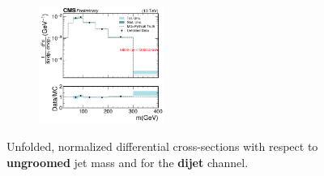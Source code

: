 \begin{figure}[htp!]
\begin{subfigure}
    \end{subfigure}
    \begin{subfigure}
      \centering
      \includegraphics[width=0.45\textwidth]{figures/multijet/unfolding/dijet/binnedResult_ungroomed_4.pdf}
    \end{subfigure}
    \caption{Unfolded, normalized differential cross-sections with respect to \textbf{ungroomed} jet mass and \pt for the \textbf{dijet} channel. }
    \label{fig:dijetresultsbinned_u}
  \end{figure}
  
